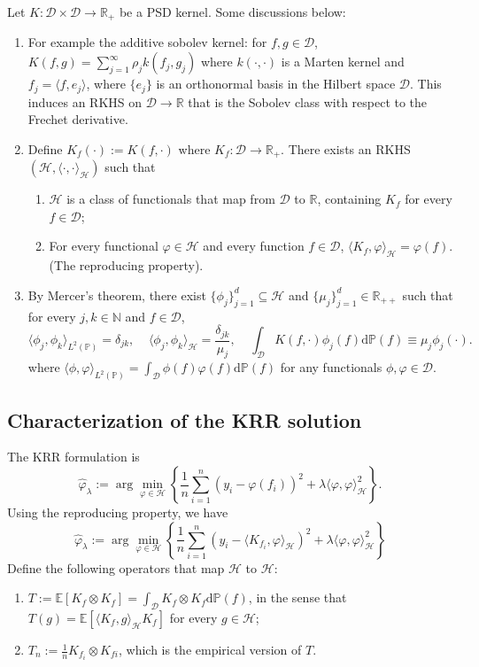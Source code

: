 \documentclass[11pt,a4paper]{article}
\renewcommand{\hat}{\widehat}
\theoremstyle{definition}
\theoremstyle{plain}
\theoremstyle{remark}
\newcommand{\mD}{\mathcal D}
\newcommand{\bP}{\mathbb P}
\newcommand{\lp}{L^2(\bP)}
\newcommand{\ud}{\mathrm d}
\newcommand{\mH}{\mathcal H}
\begin{document}
Let $K:\mD\times\mD\to\mathbb R_+$ be a PSD kernel. Some discussions below:
\begin{enumerate}
\item For example the additive sobolev kernel: for $f,g\in\mD$, $K(f,g)=\sum_{j=1}^{\infty} \rho_j k(f_j,g_j)$ where $k(\cdot,\cdot)$ is a Marten kernel and $f_j=\langle f,e_j\rangle$,
where $\{e_j\}$ is an orthonormal basis in the Hilbert space $\mD$. This induces an RKHS on $\mD\to\mathbb R$ that is the Sobolev class with respect to the Frechet derivative.
\item Define $K_f(\cdot) := K(f,\cdot)$ where $K_f:\mD\to\mathbb R_+$. There exists an RKHS $(\mH,\langle\cdot,\cdot\rangle_{\mH})$ such that 
\begin{enumerate}
\item $\mH$ is a class of functionals that map from $\mD$ to $\mathbb R$, containing $K_f$ for every $f\in\mD$;
\item For every functional $\varphi\in\mH$ and every function $f\in\mD$, $\langle K_f,\varphi\rangle_{\mH} = \varphi(f)$. (The reproducing property).
\end{enumerate}
\item By Mercer's theorem, there exist $\{\phi_j\}_{j=1}^d\subseteq\mH$ and $\{\mu_j\}_{j=1}^d\in\mathbb R_{++}$ such that for every $j,k\in\mathbb N$ and $f\in\mD$, 
$$
\langle\phi_j,\phi_k\rangle_{\lp} = \delta_{jk},\;\;\;\;\langle\phi_j,\phi_k\rangle_{\mH} = \frac{\delta_{jk}}{\mu_j},\;\;\;\; \int_{\mD}K(f,\cdot)\phi_j(f)\ud\bP(f) \equiv \mu_j\phi_j(\cdot).
$$
where $\langle \phi,\varphi\rangle_{\lp} = \int_{\mD}\phi(f)\varphi(f)\ud\bP(f)$ for any functionals $\phi,\varphi\in\mD$.
\end{enumerate}

\subsection{Characterization of the KRR solution}
The KRR formulation is
$$
\hat\varphi_\lambda := \arg\min_{\varphi\in\mH}\left\{ \frac{1}{n}\sum_{i=1}^n(y_i-\varphi(f_i))^2 + \lambda \langle\varphi,\varphi\rangle_{\mH}^2\right\}.
$$
Using the reproducing property, we have 
$$
\hat\varphi_\lambda := \arg\min_{\varphi\in\mH}\left\{ \frac{1}{n}\sum_{i=1}^n(y_i-\langle K_{f_i},\varphi\rangle_{\mH})^2 + \lambda \langle\varphi,\varphi\rangle_{\mH}^2\right\}
$$
Define the following operators that map $\mH$ to $\mH$:
\begin{enumerate}
\item $T := \mathbb E[K_f\otimes K_f] = \int_{\mD}K_f\otimes K_f\ud\bP(f)$, in the sense that $T(g)=\mathbb E[\langle K_f,g\rangle_{\mH}K_f]$ for every $g\in\mH$;
\item $T_n := \frac{1}{n}K_{f_i}\otimes K_{fi}$, which is the empirical version of $T$.
\end{enumerate}
\end{document}
